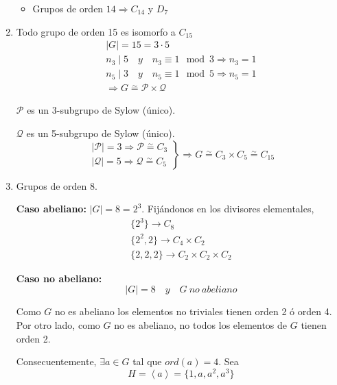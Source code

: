 \documentclass{article}
\begin{document}
\begin{enumerate}[(1)]
\begin{itemize}
\item Grupos de orden $14\Rightarrow C_{14}$ y $D_7$
\end{itemize}

\item Todo grupo de orden 15 es isomorfo a $C_{15}$
\begin{gather*}
|G|=15=3\cdot 5\\
n_3\mid 5\quad y\quad n_3\equiv 1\mod{3}\Rightarrow n_3=1\\
n_5\mid 3\quad y\quad n_5\equiv 1\mod{5}\Rightarrow n_5=1\\
\Rightarrow G\overset{\sim}{=} \mathcal{P}\times \mathcal{Q}
\end{gather*}

$\mathcal{P}$ es un 3-subgrupo de Sylow (único).

$\mathcal{Q}$ es un 5-subgrupo de Sylow (único).
\begin{equation*}
\left.\begin{array}{c}
|\mathcal{P}|=3\Rightarrow \mathcal{P}\overset{\sim}{=} C_3\\
|\mathcal{Q}|=5\Rightarrow \mathcal{Q}\overset{\sim}{=} C_5
\end{array}\right\rbrace \Rightarrow G\overset{\sim}{=} C_3\times C_5\overset{\sim}{=} C_{15}
\end{equation*}

\item Grupos de orden 8.

\textbf{Caso abeliano:} $|G|=8=2^3$. Fijándonos en los divisores elementales,
\begin{gather*}
\{2^3\}\longrightarrow C_8\\
\{2^2,2\}\longrightarrow C_4\times C_2\\
\{2,2,2\}\longrightarrow C_2\times C_2\times C_2
\end{gather*}

\textbf{Caso no abeliano:}
\begin{equation*}
|G|=8\quad y\quad G\:no\:abeliano
\end{equation*}

Como $G$ no es abeliano los elementos no triviales tienen orden 2 ó orden 4. Por otro lado, como $G$ no es abeliano, no todos los elementos de $G$ tienen orden 2.

Consecuentemente, $\exists a\in G$ tal que $ord(a)=4$. Sea
\begin{equation*}
H=\left\langle a\right\rangle =\{1,a,a^2,a^3\}
\end{equation*}


\end{enumerate}
\end{document}
